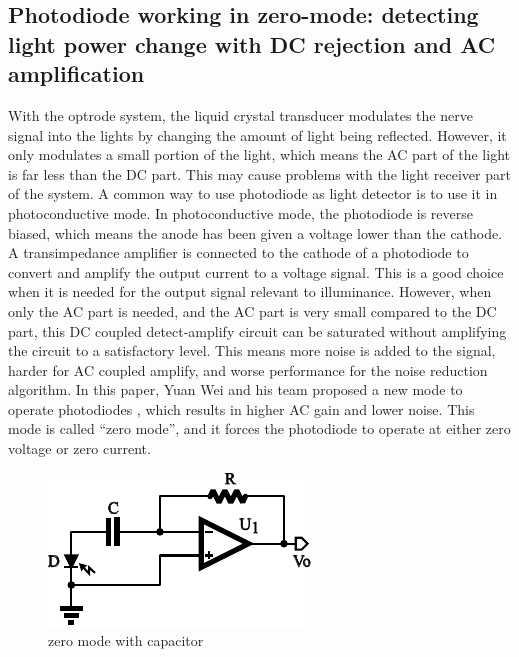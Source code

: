   \subsection{Photodiode working in zero-mode: detecting light power change with DC rejection and AC amplification}

With the optrode system, the liquid crystal transducer modulates the nerve signal into the lights by changing the amount of light being reflected.  However, it only modulates a small portion of the light, which means the AC part of the light is far less than the DC part.  This may cause problems with the light receiver part of the system.
A common way to use photodiode as light detector is to use it in photoconductive mode.  In photoconductive mode, the photodiode is reverse biased, which means the anode has been given a voltage lower than the cathode.  A transimpedance amplifier is connected to the cathode of a photodiode to convert and amplify the output current to a voltage signal.  This is a good choice when it is needed for the output signal relevant to illuminance.  However, when only the AC part is needed, and the AC part is very small compared to the DC part, this DC coupled detect-amplify circuit can be saturated without amplifying the circuit to a satisfactory level.  This means more noise is added to the signal, harder for AC coupled amplify, and worse performance for the noise reduction algorithm.
In this paper, Yuan Wei and his team proposed a new mode to operate photodiodes \cite{zero-mode_detection}, which results in higher AC gain and lower noise.  This mode is called “zero mode”, and it forces the photodiode to operate at either zero voltage or zero current.  

\begin{figure}[htbp]
\centerline{\includegraphics[width=0.6\linewidth]{zero_mode_sch.pdf}}
\caption{zero mode with capacitor}
\label{fig_zero_mode_sch}
\end{figure}

